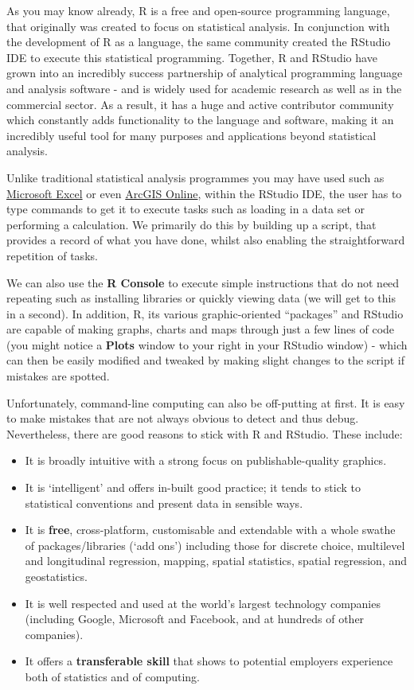 \documentclass[
]{book}
\providecommand{\tightlist}{%
  \setlength{\itemsep}{0pt}\setlength{\parskip}{0pt}}
\begin{document}
As you may know already, R is a free and open-source programming language, that originally was created to focus on statistical analysis. In conjunction with the development of R as a language, the same community created the RStudio IDE to execute this statistical programming. Together, R and RStudio have grown into an incredibly success partnership of analytical programming language and analysis software - and is widely used for academic research as well as in the commercial sector. As a result, it has a huge and active contributor community which constantly adds functionality to the language and software, making it an incredibly useful tool for many purposes and applications beyond statistical analysis.

Unlike traditional statistical analysis programmes you may have used such as \href{https://www.microsoft.com/en-us/microsoft-365/excel}{Microsoft Excel} or even \href{https://www.arcgis.com/home/index.html}{ArcGIS Online}, within the RStudio IDE, the user has to type commands to get it to execute tasks such as loading in a data set or performing a calculation. We primarily do this by building up a script, that provides a record of what you have done, whilst also enabling the straightforward repetition of tasks.

We can also use the \textbf{R Console} to execute simple instructions that do not need repeating such as installing libraries or quickly viewing data (we will get to this in a second). In addition, R, its various graphic-oriented ``packages'' and RStudio are capable of making graphs, charts and maps through just a few lines of code (you might notice a \textbf{Plots} window to your right in your RStudio window) - which can then be easily modified and tweaked by making slight changes to the script if mistakes are spotted.

Unfortunately, command-line computing can also be off-putting at first. It is easy to make mistakes that are not always obvious to detect and thus debug. Nevertheless, there are good reasons to stick with R and RStudio. These include:

\begin{itemize}
\tightlist
\item
  It is broadly intuitive with a strong focus on publishable-quality graphics.
\item
  It is `intelligent' and offers in-built good practice; it tends to stick to statistical conventions and present data in sensible ways.
\item
  It is \textbf{free}, cross-platform, customisable and extendable with a whole swathe of packages/libraries (`add ons') including those for discrete choice, multilevel and longitudinal regression, mapping, spatial statistics, spatial regression, and geostatistics.
\item
  It is well respected and used at the world's largest technology companies (including Google, Microsoft and Facebook, and at hundreds of other companies).
\item
  It offers a \textbf{transferable skill} that shows to potential employers experience both of statistics and of computing.
\end{itemize}
\end{document}
